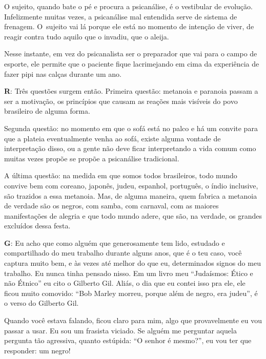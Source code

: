  

O sujeito, quando bate o pé e procura a psicanálise, é o vestibular de
evolução. Infelizmente muitas vezes, a psicanálise mal entendida serve
de sistema de frenagem. O~sujeito vai lá porque ele está no momento de
intenção de viver, de reagir contra tudo aquilo que o invadiu, que o
aleija.

 

Nesse instante, em vez do psicanalista ser o preparador que vai para o
campo de esporte, ele permite que o paciente fique lacrimejando em cima
da experiência de fazer pipi nas calças durante um ano.

 

\textbf{R}: Três questões surgem então. Primeira questão: metanoia e
paranoia passam a ser a motivação, os princípios que causam as reações
mais visíveis do povo brasileiro de alguma forma.

Segunda questão: no momento em que o sofá está no palco e há um convite
para que a plateia eventualmente venha ao sofá, existe alguma vontade de
interpretação disso, ou a gente não deve ficar interpretando a vida
comum como muitas vezes propõe se propõe a psicanálise tradicional.

A última questão: na medida em que somos todos brasileiros, todo mundo
convive bem com coreano, japonês, judeu, espanhol, português, o índio
inclusive, são trazidos a essa metanoia. Mas, de alguma maneira, quem
fabrica a metanoia de verdade são os negros, com samba, com carnaval,
com as maiores manifestações de alegria e que todo mundo adere, que são,
na verdade, os grandes excluídos dessa festa.

 

\textbf{G}: Eu acho que como alguém que generosamente tem lido,
estudado e compartilhado do meu trabalho durante alguns anos, que é o
teu caso, você captura muito bem, e às vezes até melhor do que eu,
determinados signos do meu trabalho. Eu nunca tinha pensado nisso. Em um
livro meu ``Judaísmos: Ético e não Étnico'' eu cito o Gilberto Gil.
Aliás, o dia que eu contei isso pra ele, ele ficou muito comovido: ``Bob
Marley morreu, porque além de negro, era judeu'', é o verso do Gilberto
Gil.

 

Quando você estava falando, ficou claro para mim, algo que provavelmente
eu vou passar a usar. Eu sou um frasista viciado. Se alguém me perguntar
aquela pergunta tão agressiva, quanto estúpida: ``O senhor é mesmo?'',
eu vou ter que responder: um negro!


